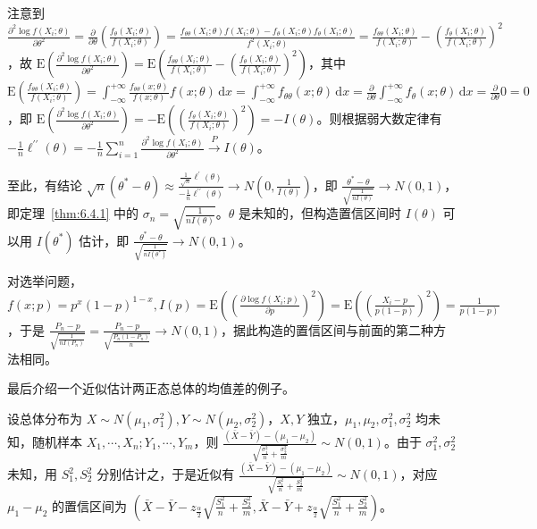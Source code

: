 \documentclass[../main.tex]{subfiles}
\begin{document}
注意到 $\frac{\partial^2\log f(X_i;\theta)}{\partial\theta^2}=\frac\partial{\partial\theta}\left(\frac{f_\theta(X_i;\theta)}{f(X_i;\theta)}\right)=\frac{f_{\theta\theta}(X_i;\theta)f(X_i;\theta)-f_\theta(X_i;\theta)f_\theta(X_i;\theta)}{f^2(X_i;\theta)}=\frac{f_{\theta\theta}(X_i;\theta)}{f(X_i;\theta)}-\left(\frac{f_\theta(X_i;\theta)}{f(X_i;\theta)}\right)^2$，故 $\mathrm E\left(\frac{\partial^2\log f(X_i;\theta)}{\partial\theta^2}\right)=\mathrm E\left(\frac{f_{\theta\theta}(X_i;\theta)}{f(X_i;\theta)}-\left(\frac{f_\theta(X_i;\theta)}{f(X_i;\theta)}\right)^2\right)$，其中 $\mathrm E(\frac{f_{\theta\theta}(X_i;\theta)}{f(X_i;\theta)})=\int_{-\infty}^{+\infty}\frac{f_{\theta\theta}(x;\theta)}{f(x;\theta)}f(x;\theta)\,\mathrm dx=\int_{-\infty}^{+\infty}f_{\theta\theta}(x;\theta)\,\mathrm dx=\frac{\partial}{\partial\theta}\int_{-\infty}^{+\infty}f_\theta(x;\theta)\,\mathrm dx=\frac{\partial}{\partial\theta}0=0$，即 $\mathrm E\left(\frac{\partial^2\log f(X_i;\theta)}{\partial\theta^2}\right)=-\mathrm E\left(\left(\frac{f_\theta(X_i;\theta)}{f(X_i;\theta)}\right)^2\right)=-I(\theta)$。则根据弱大数定律有 $-\frac1n\ell^{\prime\prime}(\theta)=-\frac1n\sum_{i=1}^n\frac{\partial^2\log f(X_i;\theta)}{\partial\theta^2}\overset{P}\rightarrow I(\theta)$。

至此，有结论 $\sqrt n(\theta^*-\theta)\approx\frac{\frac1{\sqrt n}\ell^\prime(\theta)}{-\frac1n\ell^{\prime\prime}(\theta)}\rightarrow N(0,\frac1{I(\theta)})$，即 $\frac{\theta^*-\theta}{\sqrt{\frac1{nI(\theta)}}}\rightarrow N(0,1)$，即定理~\ref{thm:6.4.1} 中的 $\sigma_n=\sqrt{\frac1{nI(\theta)}}$。$\theta$ 是未知的，但构造置信区间时 $I(\theta)$ 可以用 $I(\theta^*)$ 估计，即 $\frac{\theta^*-\theta}{\sqrt{\frac1{nI(\theta^*)}}}\rightarrow N(0,1)$。

对选举问题，$f(x;p)=p^x(1-p)^{1-x},I(p)=\mathrm E\left(\left(\frac{\partial\log f(X_i;p)}{\partial p}\right)^2\right)=\mathrm E\left(\left(\frac{X_i-p}{p(1-p)}\right)^2\right)=\frac1{p(1-p)}$，于是 $\frac{P_n-p}{\sqrt{\frac1{nI(P_n)}}}=\frac{P_n-p}{\sqrt{\frac{P_n(1-P_n)}n}}\rightarrow N(0,1)$，据此构造的置信区间与前面的第二种方法相同。

最后介绍一个近似估计两正态总体的均值差的例子。

\begin{example}
    设总体分布为 $X\sim N(\mu_1,\sigma_1^2),Y\sim N(\mu_2,\sigma_2^2)$，$X,Y$ 独立，$\mu_1,\mu_2,\sigma_1^2,\sigma_2^2$ 均未知，随机样本 $X_1,\cdots,X_n;Y_1,\cdots,Y_m$，则 $\frac{(\bar X-\bar Y)-(\mu_1-\mu_2)}{\sqrt{\frac{\sigma_1^2}n+\frac{\sigma_2^2}m}}\sim N(0,1)$。由于 $\sigma_1^2,\sigma_2^2$ 未知，用 $S_1^2,S_2^2$ 分别估计之，于是近似有 $\frac{(\bar X-\bar Y)-(\mu_1-\mu_2)}{\sqrt{\frac{S_1^2}n+\frac{S_2^2}m}}\sim N(0,1)$，对应 $\mu_1-\mu_2$ 的置信区间为 $(\bar X-\bar Y-z_{\frac\alpha2}\sqrt{\frac{S_1^2}n+\frac{S_2^2}m},\bar X-\bar Y+z_{\frac\alpha2}\sqrt{\frac{S_1^2}n+\frac{S_2^2}m})$。
\end{example}
\end{document}
